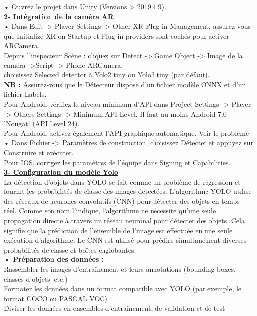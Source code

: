 \documentclass[a4paper, 13px]{article}
\begin{document}
•	Ouvrez le projet dans Unity (Versions > 2019.4.9).\\

{\bfseries \underline{2-	Intégration de la caméra AR}}\\

•	Dans Edit -> Player Settings -> Other XR Plug-in Management, assurez-vous que Initialize XR on Startup et Plug-in providers sont cochés pour activer ARCamera.\\
Depuis l'inspecteur Scène : cliquez sur Detect -> Game Object -> Image de la caméra ->Script -> Phone ARCamera.\\ choisissez Selected detector à Yolo2 tiny ou Yolo3 tiny (par défaut).\\ 
{\bfseries \MakeUppercase{NB :}} Assurez-vous que le Détecteur dispose d'un fichier modèle ONNX et d'un fichier Labels.\\
Pour Android, vérifiez le niveau minimum d'API dans Project Settings -> Player -> Others Settings -> Minimum API Level. Il faut au moins Android 7.0 'Nougat' (API Level 24).\\
Pour Android, activez également l'API graphique automatique. Voir le problème\\
•	Dans Fichier -> Paramètres de construction, choisissez Détecter et appuyez sur Construire et exécuter.\\
Pour IOS, corrigez les paramètres de l'équipe dans Signing et Capabilities.\\

{\bfseries \underline{3-	Configuration du modèle Yolo}}\\

La détection d’objets dans YOLO se fait comme un problème de régression et fournit les probabilités de classe des images détectées.
L’algorithme YOLO utilise des réseaux de neurones convolutifs (CNN) pour détecter des objets en temps réel. Comme son nom l’indique, l’algorithme ne nécessite qu’une seule propagation directe à travers un réseau neuronal pour détecter des objets.
Cela signifie que la prédiction de l’ensemble de l’image est effectuée en une seule exécution d’algorithme. Le CNN est utilisé pour prédire simultanément diverses probabilités de classe et boîtes englobantes.\\

{\bfseries {•	 Préparation des données :}}\\
	Rassembler les images d'entraînement et leurs annotations (bounding boxes, classes d'objets, etc.)\\
	Formater les données dans un format compatible avec YOLO (par exemple, le format COCO ou PASCAL VOC)\\
	Diviser les données en ensembles d'entraînement, de validation et de test\\
	
\end{document}
